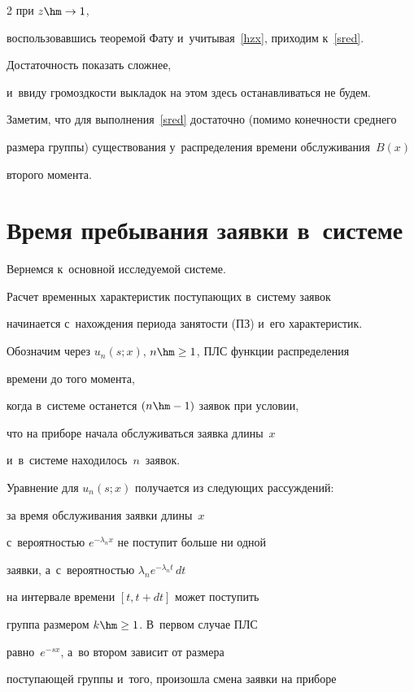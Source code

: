 \begin{multicols}{2}
при $z \hm\rightarrow 1$,


воспользовавшись теоремой Фату и~учитывая~\eqref{hzx}, приходим к~\eqref{sred}.





Достаточность показать сложнее, 


и~ввиду громоздкости выкладок на этом здесь останавливаться не будем.


Заметим, что для выполнения~\eqref{sred} достаточно (помимо конечности среднего


размера группы) существования у~распределения времени обслуживания~$B(x)$ 


второго момента.





\section{Время пребывания заявки в~системе}





Вернемся к~основной исследуемой системе.


Расчет временных характеристик поступающих в~сис\-те\-му заявок


начинается с~нахождения периода занятости (ПЗ) и~его характеристик.


Обозначим через $u_n(s;x)$, $n\hm\ge 1$, ПЛС функции распределения


времени до того момента,


когда в~системе останется $(n\hm-1)$ заявок при условии,


что на приборе начала обслуживаться заявка длины~$x$


и~в~системе находилось~$n$~заявок.


Уравнение для $u_n(s;x)$ получается из следующих рассуждений:


за время обслуживания заявки длины~$x$


с~вероятностью $e^{- \lambda_n x}$ не поступит больше ни одной


заявки, а~с~вероятностью $\lambda_n e^{- \lambda_n t}\,dt$


на интервале времени $[t,t+dt]$ может поступить


группа размером $k\hm\ge1$. В~первом случае ПЛС


равно~$e^{-sx}$, а~во втором зависит от размера


поступающей группы и~того, произошла смена заявки на приборе



\end{multicols}
